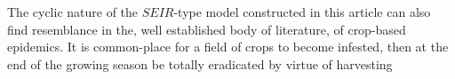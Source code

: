 
The cyclic nature of the $SEIR$-type model constructed in this article can also find resemblance in the, well established body of literature, of crop-based epidemics. It is common-place for a field of crops to become infested, then at the end of the growing season be totally eradicated by virtue of harvesting 








